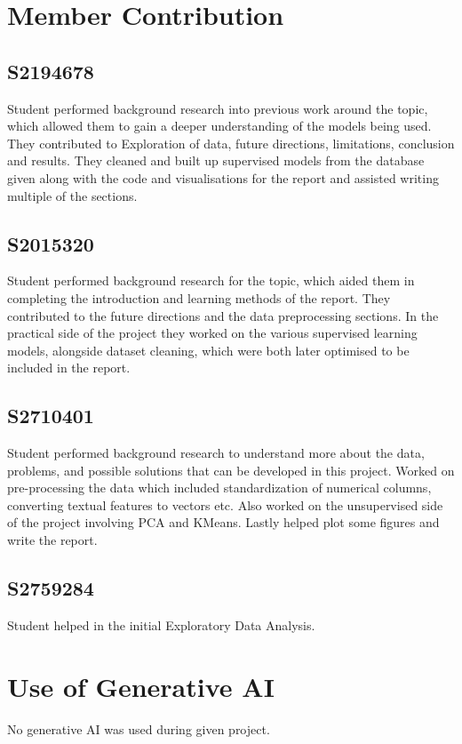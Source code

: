 \documentclass{article}
\begin{document}
\pagebreak




\newpage
\section{Member Contribution}


\subsection{S2194678}
Student performed background research into previous work around the topic, which allowed them to gain a deeper understanding of the models being used. They contributed to Exploration of data, future directions, limitations, conclusion and results. They cleaned and built up supervised models from the database given along with the code and visualisations for the report and assisted writing multiple of the sections. 

\subsection{S2015320}
Student performed background research for the topic, which aided them in completing the introduction and learning methods of the report. They contributed to the future directions and the data preprocessing sections. In the practical side of the project they worked on the various supervised learning models, alongside dataset cleaning, which were both later optimised to be included in the report. 

\subsection{S2710401}
Student performed background research to understand more about the data, problems, and possible solutions that can be developed in this project. Worked on pre-processing the data which included standardization of numerical columns, converting textual features to vectors etc. Also worked on the unsupervised side of the project involving PCA and KMeans. Lastly helped plot some figures and write the report. 

\subsection{S2759284}
Student helped in the initial Exploratory Data Analysis. 

\section{Use of Generative AI}

No generative AI was used during given project.
\end{document}
